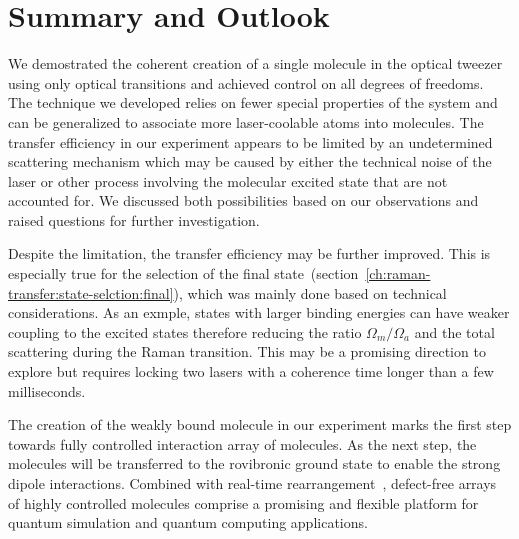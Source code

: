 \section{Summary and Outlook}
\label{ch:raman-transfer:summary}

We demostrated the coherent creation of a single molecule in the optical tweezer
using only optical transitions and achieved control on all degrees of freedoms.
The technique we developed relies on fewer special properties of the system
and can be generalized to associate more laser-coolable atoms into molecules.
The transfer efficiency in our experiment appears to be limited
by an undetermined scattering mechanism which may be caused by
either the technical noise of the laser
or other process involving the molecular excited state that are not accounted for.
We discussed both possibilities based on our observations
and raised questions for further investigation.

Despite the limitation, the transfer efficiency may be further improved.
This is especially true for the selection
of the final state~(section~\ref{ch:raman-transfer:state-selction:final}),
which was mainly done based on technical considerations.
As an exmple, states with larger binding energies can have weaker coupling
to the excited states therefore reducing the ratio $\Omega_m/\Omega_a$
and the total scattering during the Raman transition.
This may be a promising direction to explore
but requires locking two lasers with a coherence time longer than a few milliseconds.

The creation of the weakly bound molecule in our experiment marks
the first step towards fully controlled interaction array of molecules.
As the next step, the molecules will be transferred to the rovibronic ground state
to enable the strong dipole interactions.
Combined with real-time rearrangement~\cite{barredo_atom-by-atom_2016,endres_atom-by-atom_2016},
defect-free arrays of highly controlled molecules comprise a promising
and flexible platform for quantum simulation and quantum computing applications.
